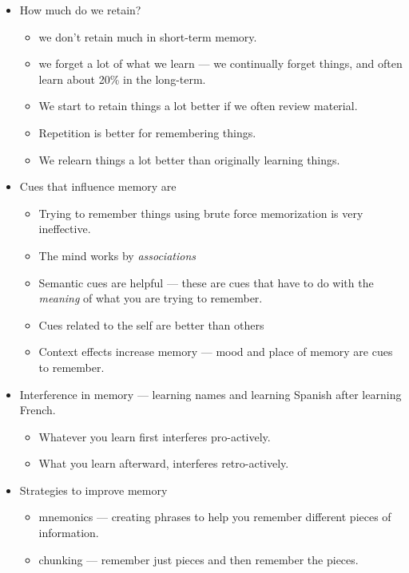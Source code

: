 \documentclass[12pt]{article}
\begin{document}
\begin{itemize}
	\item How much do we retain?
		\begin{itemize}
			\item we don't retain much in short-term memory.
			\item we forget a lot of what we learn --- we continually forget
				things, and often learn about 20\% in the long-term.
			\item We start to retain things a lot better if we often review
				material.
			\item Repetition is better for remembering things.
			\item We relearn things a lot better than originally learning
				things.
		\end{itemize}
	\item Cues that influence memory are
		\begin{itemize}
			\item Trying to remember things using brute force memorization is
				very ineffective.
			\item The mind works by \emph{associations}
			\item Semantic cues are helpful --- these are  cues that have to do
				with the \emph{meaning} of what you are trying to remember.
			\item Cues related to the self are better than others
			\item Context effects increase memory --- mood and place of memory
				are cues to remember.
		\end{itemize}
	\item Interference in memory --- learning names and learning Spanish after
		learning French.
		\begin{itemize}
			\item Whatever you learn first interferes pro-actively.
			\item What you learn afterward, interferes retro-actively.
		\end{itemize}
	\item Strategies to improve memory
		\begin{itemize}
			\item mnemonics --- creating phrases to help you remember different
				pieces of information.
			\item chunking --- remember just pieces and then remember the
				pieces.
		\end{itemize}
\end{itemize}
\end{document}
